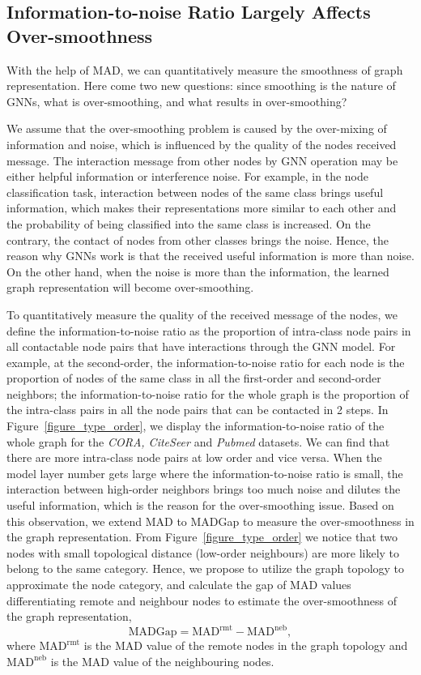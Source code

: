 \documentclass[letterpaper]{article} \usepackage{aaai20}  \usepackage{times}  \usepackage{helvet} \usepackage{courier}  \usepackage[hyphens]{url}  \usepackage{graphicx} \urlstyle{rm} \def\UrlFont{\rm}  \frenchspacing  \setlength{\pdfpagewidth}{8.5in}  \setlength{\pdfpageheight}{11in}  \setcounter{secnumdepth}{0}
\begin{document}
\subsection{Information-to-noise Ratio Largely Affects Over-smoothness}

With the help of MAD, we can quantitatively measure the smoothness of graph representation. Here come two new questions: since smoothing is the nature of GNNs, what is over-smoothing, and what results in over-smoothing?

We assume that the over-smoothing problem is caused by the over-mixing of information and noise, which is influenced by the quality of the nodes received message.
The interaction message from other nodes by GNN operation may be either helpful information or interference noise.
For example, in the node classification task, interaction between nodes of the same class brings useful information, which makes their representations more similar to each other and the probability of being classified into the same class is increased. 
On the contrary, the contact of nodes from other classes brings the noise. Hence, the reason why GNNs work is that the received useful information is more than noise. On the other hand, when the noise is more than the information, the learned graph representation will become over-smoothing.

To quantitatively measure the quality of the received message of the nodes, we define the information-to-noise ratio as the proportion of intra-class node pairs in all contactable node pairs that have interactions through the GNN model. For example, at the second-order, the information-to-noise ratio for each node is the proportion of nodes of the same class in all the first-order and second-order neighbors; the information-to-noise ratio for the whole graph is the proportion of the intra-class pairs in all the node pairs that can be contacted in 2 steps.
In Figure~\ref{figure_type_order}, we display the information-to-noise ratio of the whole graph for the \textit{CORA, CiteSeer} and \textit{Pubmed} datasets.
We can find that there are more intra-class node pairs at low order and vice versa. 
When the model layer number gets large where the information-to-noise ratio is small, the interaction between high-order neighbors brings too much noise and dilutes the useful information, which is the reason for the over-smoothing issue.
Based on this observation, we extend MAD to MADGap to measure the over-smoothness in the graph representation. 
From Figure~\ref{figure_type_order} we notice that two nodes with small topological distance (low-order neighbours) are more likely to belong to the same category. Hence, we propose to utilize the graph topology to approximate the node category, and calculate the gap of MAD values differentiating remote and neighbour nodes to estimate the over-smoothness of the graph representation,
\begin{equation}
\mathrm{MADGap} =  \mathrm{MAD^{rmt}} -  \mathrm{MAD^{neb}},
\end{equation}
where $\mathrm{MAD^{rmt}}$ is the $\mathrm{MAD}$ value of the remote nodes in the graph topology and $\mathrm{MAD^{neb}}$ is the $\mathrm{MAD}$ value of the neighbouring nodes.
\end{document}
